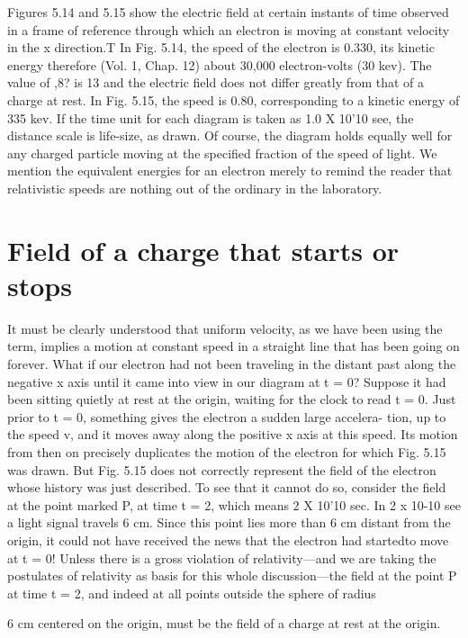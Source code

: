 Figures 5.14 and 5.15 show the electric field at certain instants of
time observed in a frame of reference through which an electron is
moving at constant velocity in the x direction.T In Fig. 5.14, the
speed of the electron is 0.330, its kinetic energy therefore (Vol. 1,
Chap. 12) about 30,000 electron-volts (30 kev). The value of ,8?
is 13 and the electric field does not differ greatly from that of a charge
at rest. In Fig. 5.15, the speed is 0.80, corresponding to a kinetic
energy of 335 kev. If the time unit for each diagram is taken as
1.0 X 10'10 see, the distance scale is life-size, as drawn. Of course,
the diagram holds equally well for any charged particle moving at
the specified fraction of the speed of light. We mention the equivalent
energies for an electron merely to remind the reader that relativistic
speeds are nothing out of the ordinary in the laboratory.

\section{Field of a charge that starts or stops}

It must be clearly understood that uniform velocity, as we have
been using the term, implies a motion at constant speed in a straight
line that has been going on forever. What if our electron had not
been traveling in the distant past along the negative x axis until it
came into view in our diagram at t = 0? Suppose it had been sitting
quietly at rest at the origin, waiting for the clock to read t = 0. Just
prior to t = 0, something gives the electron a sudden large accelera-
tion, up to the speed v, and it moves away along the positive x axis
at this speed. Its motion from then on precisely duplicates the motion
of the electron for which Fig. 5.15 was drawn. But Fig. 5.15
does not correctly represent the field of the electron whose history
was just described. To see that it cannot do so, consider the field at
the point marked P, at time t = 2, which means 2 X 10'10 sec. In
2 x 10-10 see a light signal travels 6 cm. Since this point lies more
than 6 cm distant from the origin, it could not have received the news
that the electron had startedto move at t = 0! Unless there is a
gross violation of relativity---and we are taking the postulates of
relativity as basis for this whole discussion---the field at the point P
at time t = 2, and indeed at all points outside the sphere of radius

6 cm centered on the origin, must be the field of a charge at rest at the
origin.

